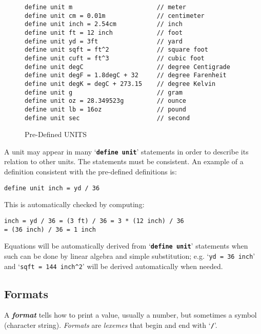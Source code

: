 \documentclass[12pt]{article}
\makeatletter
\newcommand{\TT}[1]{{\tt \bfseries #1}}
\newcommand{\emkey}[1]{{\bf \em #1}\index{#1@{\em #1}}}
\newcommand{\CIRCUM}{\textasciicircum}
\newlength{\figurewidth}
\newenvironment{boxedfigure}[1][!btp]%
	{\begin{figure*}[#1]
	 \begin{lrbox}{\figurebox}
	 \begin{minipage}{\figurewidth}

	 \vspace*{1ex}}%
	{
	 \vspace*{1ex}

	 \end{minipage}
	 \end{lrbox}
	 \begin{center}
	 \fbox{\hspace*{0.1in}\usebox{\figurebox}\hspace*{0.1in}}
	 \end{center}
	 \end{figure*}}
\newenvironment{indpar}[1][0.3in]%
	{\begin{list}{}%
		     {\setlength{\itemsep}{0in}%
		      \setlength{\topsep}{0in}%
		      \setlength{\parsep}{1ex}%
		      \setlength{\labelwidth}{#1}%
		      \setlength{\leftmargin}{#1}%
		      \addtolength{\leftmargin}{\labelsep}}%
	 \item}%
	{\end{list}}
\makeatother
\begin{document}
\begin{boxedfigure}[t]
\begin{indpar}\begin{verbatim}
define unit m                       // meter
define unit cm = 0.01m              // centimeter
define unit inch = 2.54cm           // inch
define unit ft = 12 inch            // foot
define unit yd = 3ft                // yard
define unit sqft = ft^2             // square foot
define unit cuft = ft^3             // cubic foot
define unit degC                    // degree Centigrade
define unit degF = 1.8degC + 32     // degree Farenheit
define unit degK = degC + 273.15    // degree Kelvin
define unit g                       // gram
define unit oz = 28.349523g         // ounce
define unit lb = 16oz               // pound
define unit sec                     // second
\end{verbatim}\end{indpar}

\caption{Pre-Defined UNITS}
\label{PRE-DEFINED-UNITS}
\end{boxedfigure}

A unit may appear in many `\TT{define unit}' statements in order to describe
its relation to other units.  The statements must be consistent.
An example of a definition consistent with the pre-defined
definitions is:

\begin{indpar}\begin{verbatim}
define unit inch = yd / 36
\end{verbatim}\end{indpar}

This is automatically checked by computing:
\begin{center}
\tt inch = yd / 36 = (3 ft) / 36 = 3 * (12 inch) / 36 \\
= (36 inch) / 36 = 1 inch
\end{center}

Equations will be automatically derived from `\TT{define unit}' statements
when such can be done by linear algebra and simple substitution; e.g.
`{\tt yd = 36 inch}' and `{\tt sqft = 144 inch\CIRCUM 2}'
will be derived automatically when needed.



\subsection{Formats}
\label{FORMATS}

A \emkey{format} tells how to print a value, usually a number, but
sometimes a symbol (character string).  {\em Formats} are {\em lexemes}
that begin and end with `\TT{/}'.
\end{document}
